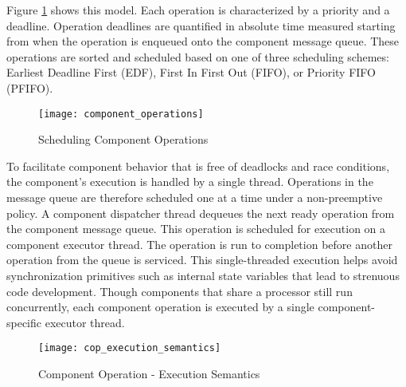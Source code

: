 Figure \ref{fig:component_operations} shows this model. Each operation is characterized by a priority and a deadline. Operation deadlines are quantified in absolute time measured starting from when the operation is enqueued onto the component message queue. These operations are sorted and scheduled based on one of three scheduling schemes: Earliest Deadline First (EDF), First In First Out (FIFO), or Priority FIFO (PFIFO). 

\begin{figure}[ht]
	\centering
	\texttt{[image: component\_operations]}
	\caption{Scheduling Component Operations}
	\label{fig:component_operations}
\end{figure}

To facilitate component behavior that is free of deadlocks and race conditions, the component's execution is handled by a single thread. Operations in the message queue are therefore scheduled one at a time under a non-preemptive policy. A component dispatcher thread dequeues the next ready operation from the component message queue. This operation is scheduled for execution on a component executor thread. The operation is run to completion before another operation from the queue is serviced. This single-threaded execution helps avoid synchronization primitives such as internal state variables that lead to strenuous code development. Though components that share a processor still run concurrently, each component operation is executed by a single component-specific executor thread.

\begin{figure}[ht]
	\centering
	\texttt{[image: cop\_execution\_semantics]}
	\caption{Component Operation - Execution Semantics}
	\label{fig:cop_execution_semantics}
\end{figure}

